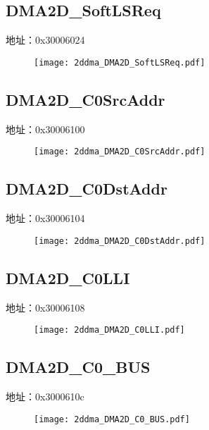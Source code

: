 \subsection{DMA2D\_SoftLSReq}
\label{2ddma-DMA2D-SoftLSReq}
地址：0x30006024
 \begin{figure}[H]
\texttt{[image: 2ddma\_DMA2D\_SoftLSReq.pdf]}
\end{figure}

\subsection{DMA2D\_C0SrcAddr}
\label{2ddma-DMA2D-C0SrcAddr}
地址：0x30006100
 \begin{figure}[H]
\texttt{[image: 2ddma\_DMA2D\_C0SrcAddr.pdf]}
\end{figure}

\subsection{DMA2D\_C0DstAddr}
\label{2ddma-DMA2D-C0DstAddr}
地址：0x30006104
 \begin{figure}[H]
\texttt{[image: 2ddma\_DMA2D\_C0DstAddr.pdf]}
\end{figure}

\subsection{DMA2D\_C0LLI}
\label{2ddma-DMA2D-C0LLI}
地址：0x30006108
 \begin{figure}[H]
\texttt{[image: 2ddma\_DMA2D\_C0LLI.pdf]}
\end{figure}

\subsection{DMA2D\_C0\_BUS}
\label{2ddma-DMA2D-C0-BUS}
地址：0x3000610c
 \begin{figure}[H]
\texttt{[image: 2ddma\_DMA2D\_C0\_BUS.pdf]}
\end{figure}

